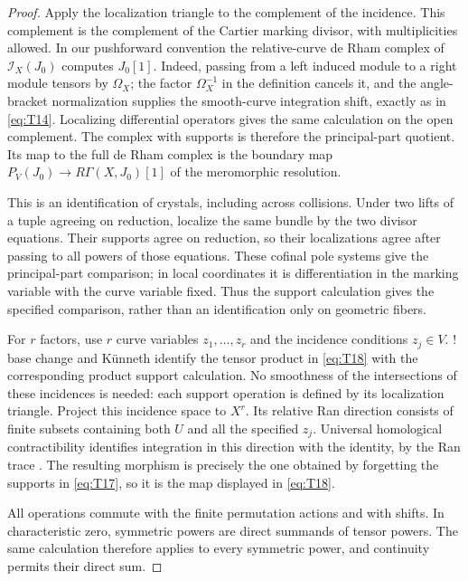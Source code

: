 \begin{proof}
Apply the localization triangle to the complement of the incidence.  This
complement is the complement of the Cartier marking divisor, with
multiplicities allowed.  In our pushforward convention the relative-curve
de Rham complex of $\mathcal I_X(J_0)$ computes $J_0[1]$.  Indeed, passing
from a left induced module to a right module tensors by $\Omega_X$;
the factor $\Omega_X^{-1}$ in the definition cancels it, and the
angle-bracket normalization supplies the smooth-curve integration shift,
exactly as in \eqref{eq:T14}.  Localizing differential operators gives the
same calculation on the open complement.  The complex with supports is
therefore the principal-part quotient.  Its map to the full de Rham
complex is the boundary map
$P_V(J_0)\to R\Gamma(X,J_0)[1]$ of the meromorphic resolution.

This is an identification of crystals, including across collisions.
Under two lifts of a tuple agreeing on reduction, localize the same
bundle by the two divisor equations.  Their supports agree on reduction,
so their localizations agree after passing to all powers of those
equations.  These cofinal pole systems give the principal-part comparison;
in local coordinates it is differentiation in the marking variable with
the curve variable fixed.  Thus the support calculation gives the
specified comparison, rather than an identification only on geometric
fibers.

For $r$ factors, use $r$ curve variables $z_1,\ldots,z_r$ and the incidence
conditions $z_j\in V$.  ! base change and K\"unneth identify the tensor
product in \eqref{eq:T18} with the corresponding product support
calculation.  No smoothness of the intersections of these incidences is
needed: each support operation is defined by its localization triangle.
Project this incidence space to $X^r$.  Its relative Ran direction consists
of finite subsets containing both $U$ and all the specified $z_j$.
Universal homological contractibility identifies integration in this
direction with the identity, by the Ran trace
\cite[Theorem~1.6.5, Section~2.5.12, and Corollary~2.5.13]
{GaitsgoryContractibility}.  The resulting morphism is precisely the
one obtained by forgetting the supports in \eqref{eq:T17}, so it is the
map displayed in \eqref{eq:T18}.

All operations commute with the finite permutation actions and with
shifts.  In characteristic zero, symmetric powers are direct summands of
tensor powers.  The same calculation therefore applies to every symmetric
power, and continuity permits their direct sum.
\end{proof}

